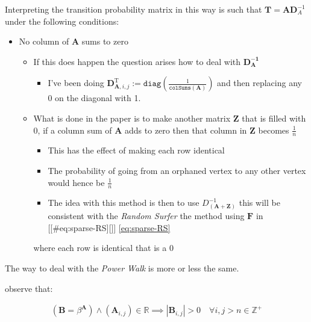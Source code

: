 \documentclass[11pt]{report}
\begin{document}
Interpreting the transition probability matrix in this way is such that
\(\mathbf{T}= \mathbf{A}\mathbf{D}^{- 1}_A\) under the following
conditions:


\begin{itemize}
\item No column of \(\mathbf{A}\) sums to zero

\begin{itemize}
\item If this does happen the question arises how to deal with
\(\mathbf{D_\mathbf{A}^{- 1}}\)

\begin{itemize}
\item I've been doing \(\mathbf{D}^{\mathrm{T}}_{\mathbf{A}, i, j} := \mathtt{diag} \left( {\frac{1}{\mathtt{colSums}\left( \mathbf{A} \right)}} \right)\)
and then replacing any \(0\) on the diagonal with 1.
\end{itemize}

\item What is done in the paper is to make another matrix \(\mathbf{Z}\)
that is filled with 0, if a column sum of \(\mathbf{A}\) adds to zero
then that column in \(\mathbf{Z}\) becomes \(\frac{1}{n}\)

\begin{itemize}
\item This has the effect of making each row identical

\item The probability of going from an orphaned vertex to any other
vertex would hence be \(\frac{1}{n}\)

\item The idea with this method is then to use
\(D_\mathbf{\left( A+Z \right)}^{- 1}\) this will be consistent with
the \emph{Random Surfer} the method using \(\mathbf{F}\) in
[[\#eq:sparse-RS][]] \eqref{eq:sparse-RS}
\end{itemize}

where each row is identical that is a 0
\end{itemize}
\end{itemize}

The way to deal with the \emph{Power Walk} is more or less the same.

observe that:

\begin{align}
   \left( \mathbf{B} = \beta^{\mathbf{A}} \right)\wedge \left( \mathbf{A}_{i, j}\right)\in \mathbb{R}  \implies  \left\lvert \mathbf{B}_{i, j} \right\rvert > 0 \quad \forall i,j>n\in \mathbb{Z}^+ \label{eq:b-is-pos}
\end{align}
\end{document}
